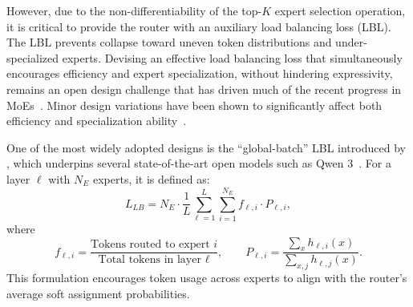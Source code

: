 However, due to the non-differentiability of the top-$K$ expert selection operation, it is critical to provide the router with an auxiliary load balancing loss (LBL). The LBL prevents collapse toward uneven token distributions and under-specialized experts. Devising an effective load balancing loss that simultaneously encourages efficiency and expert specialization, without hindering expressivity, remains an open design challenge that has driven much of the recent progress in MoEs~\citep{moe_sem_2, moe_mod_2_switch_1exp, moe_lbl_evo1, moe_lbl_evo2_zloss, moe_lbl_evo3, moe_deepseek_moe, moe_deepseek_demon, moe_similar_olmoe}. Minor design variations have been shown to significantly affect both efficiency and specialization ability~\citep{moe_deepseek_moe, moe_mixtral_lack_spec, moe_chameleon_lack_spec, moe_deepseek_demon_conc, moe_deepseek_demon}. 

One of the most widely adopted designs is the ``global-batch'' LBL introduced by \citet{moe_sem_2}, which underpins several state-of-the-art open models such as Qwen 3~\citep{moe_qwen3}. For a layer $\ell$ with $N_E$ experts, it is defined as:
\begin{equation}
\label{eq:moe_modern_lbl_extended}
L_{LB} = N_E \cdot \frac{1}{L}\sum_{\ell=1}^L \sum_{i=1}^{N_E} f_{\ell,i} \cdot P_{\ell,i},
\end{equation}
where
\[
f_{\ell,i} = \frac{\text{Tokens routed to expert } i}{\text{Total tokens in layer } \ell}, \qquad
P_{\ell,i} = \frac{\sum_{x} h_{\ell,i}(x)}{\sum_{x,j} h_{\ell,j}(x)}.
\]
This formulation encourages token usage across experts to align with the router’s average soft assignment probabilities.

